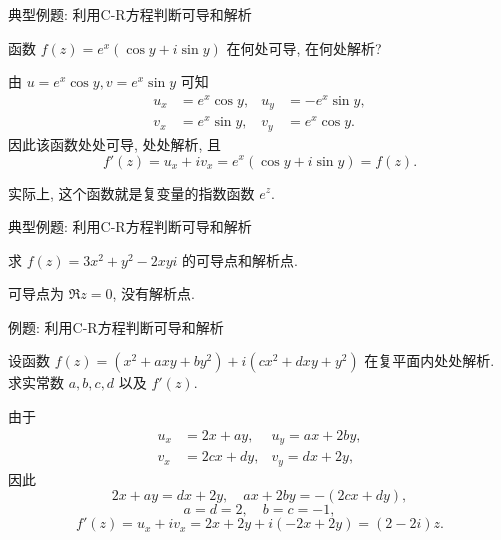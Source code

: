 \begin{frame}{典型例题: 利用C-R方程判断可导和解析}
\begin{example}[续]
 函数 $f(z)=e^x(\cos y+i\sin y)$ 在何处可导, 在何处解析?
\end{example}
\begin{solution}
由 $u=e^x\cos y,v=e^x\sin y$
\onslide<+->
可知
\begin{align*}
u_x&=e^x\cos y,&u_y&=-e^x\sin y,\\
v_x&=e^x\sin y,&v_y&=e^x\cos y.
\end{align*}
\onslide<+->
因此该函数处处可导, 处处解析, 且
\[f'(z)=u_x+iv_x=e^x(\cos y+i\sin y)=f(z).\]
\end{solution}
\onslide<+->
实际上, 这个函数就是复变量的指数函数 $e^z$.
\end{frame}


\begin{frame}{典型例题: 利用C-R方程判断可导和解析}
\begin{exercise}
求 $f(z)=3x^2+y^2-2xyi$ 的可导点和解析点.
\end{exercise}
\begin{answer}
可导点为 $\Re z=0$, 没有解析点.
\end{answer}
\end{frame}


\begin{frame}{例题: 利用C-R方程判断可导和解析}
\beqskip{4pt}
\begin{example}
设函数 $f(z)=(x^2+axy+by^2)+i(cx^2+dxy+y^2)$ 在复平面内处处解析. 求实常数 $a,b,c,d$ 以及 $f'(z)$.
\end{example}
\begin{solution}
由于
\begin{align*}
u_x&=2x+ay,&u_y=ax+2by,\\
v_x&=2cx+dy,&v_y=dx+2y,
\end{align*}
\onslide<+->
因此
\[2x+ay=dx+2y,\quad ax+2by=-(2cx+dy),\]
\vspace{-\baselineskip}
\onslide<+->
\[a=d=2,\quad b=c=-1,\]
\vspace{-\baselineskip}
\onslide<+->
\[f'(z)=u_x+iv_x=2x+2y+i(-2x+2y)=(2-2i)z.\]
\end{solution}
\endgroup
\end{frame}


